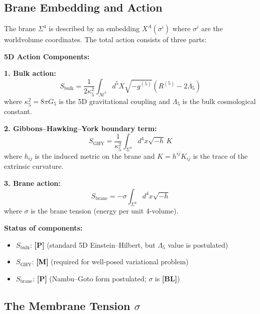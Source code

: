 \documentclass[11pt,a4paper]{article}
\newcommand{\tagP}{\textcolor{red!70!black}{\textbf{[P]}}}
\newcommand{\tagBL}{\textcolor{gray!70!black}{\textbf{[BL]}}}
\newcommand{\tagM}{\textcolor{black}{\textbf{[M]}}}
\begin{document}
\subsection{Brane Embedding and Action}

The brane $\Sigma^4$ is described by an embedding $X^A(\sigma^i)$ where $\sigma^i$ are the worldvolume coordinates. The total action consists of three parts:

\begin{derivbox}
\textbf{5D Action Components:}

\textbf{1. Bulk action:}
\begin{equation}
    S_{\text{bulk}} = \frac{1}{2\kappa_5^2} \int_{\mathcal{M}^5} d^5X \sqrt{-g^{(5)}} \left( R^{(5)} - 2\Lambda_5 \right)
    \label{eq:S_bulk}
\end{equation}
where $\kappa_5^2 = 8\pi G_5$ is the 5D gravitational coupling and $\Lambda_5$ is the bulk cosmological constant.

\textbf{2. Gibbons--Hawking--York boundary term:}
\begin{equation}
    S_{\text{GHY}} = \frac{1}{\kappa_5^2} \int_{\Sigma^4} d^4x \sqrt{-h}\, K
    \label{eq:S_GHY}
\end{equation}
where $h_{ij}$ is the induced metric on the brane and $K = h^{ij} K_{ij}$ is the trace of the extrinsic curvature.

\textbf{3. Brane action:}
\begin{equation}
    S_{\text{brane}} = -\sigma \int_{\Sigma^4} d^4x \sqrt{-h}
    \label{eq:S_brane}
\end{equation}
where $\sigma$ is the brane tension (energy per unit 4-volume).
\end{derivbox}

\textbf{Status of components:}
\begin{itemize}
    \item $S_{\text{bulk}}$: \tagP{} (standard 5D Einstein--Hilbert, but $\Lambda_5$ value is postulated)
    \item $S_{\text{GHY}}$: \tagM{} (required for well-posed variational problem)
    \item $S_{\text{brane}}$: \tagP{} (Nambu--Goto form postulated; $\sigma$ is \tagBL{})
\end{itemize}

\subsection{The Membrane Tension $\sigma$}
\end{document}
